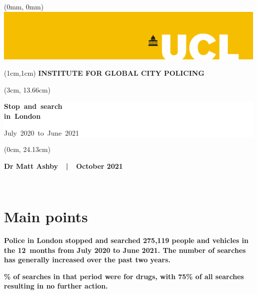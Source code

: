 \documentclass[
  a4paper,
  twoside, 11pt]{article}
\begin{document}
\begin{textblock*}{21cm}(0mm, 0mm)
\includegraphics[width=21cm]{../ucl-banner-port-yellow-rgb-lg.png}
\end{textblock*}

\begin{textblock*}{21cm}(1cm,1cm)
\textbf{\sffamily INSTITUTE FOR GLOBAL CITY POLICING}
\end{textblock*}

\begin{textblock*}{18cm}(3cm, 13.66cm)
\raggedright \sffamily
\begin{singlespace}
\colorbox{white}{\hspace{1cm}\parbox[c][5.9cm]{16cm}{
{\fontsize{40}{32}\selectfont \bfseries \mbox{Stop and search}\\\mbox{in London}
\vspace{6pt}}

{\fontsize{40}{32}\selectfont \mbox{July 2020 to June 2021} }

}\hspace{1cm}}
\end{singlespace}
\end{textblock*}

\begin{textblock*}{11.43cm}(0cm, 24.13cm)
\colorbox{uclyellow}{\parbox[c][2.63cm]{\textwidth}{
\centering \bfseries \sffamily \fontsize{16}{16}\selectfont 
Dr Matt Ashby\ \ |\ \ October 2021
}}
\end{textblock*}

~

\thispagestyle{empty}
\newpage

\hypertarget{main-points}{%
\section{Main points}\label{main-points}}

\textbf{\sffamily Police in London stopped and searched 275,119 people and vehicles in the 12~months from July 2020 to June 2021. The number of searches has generally increased over the past two years.}

\textbf{\% of searches in that period were for drugs, with 75\% of all searches resulting in no further action.}
\end{document}

